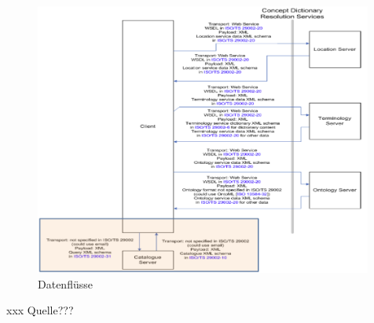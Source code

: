 \begin{figure}[htbp]
	\centering
		\includegraphics[width=0.99\textwidth]{images/datenfluesse_plib.png}
	\caption{Datenflüsse}
	\label{fig:datenfluesse}
\end{figure}
xxx Quelle???


